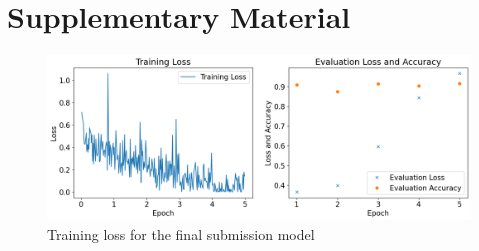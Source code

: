 \documentclass[11pt,a4paper]{article}
\begin{document}



\appendix

\section{Supplementary Material}

\begin{figure}[H]
    \includegraphics[trim=0 0 15.5cm 0, clip, width=\linewidth]{figures/final-loss.png}
    \caption{Training loss for the final submission model}
    \label{fig:final-loss}
\end{figure}
\end{document}
